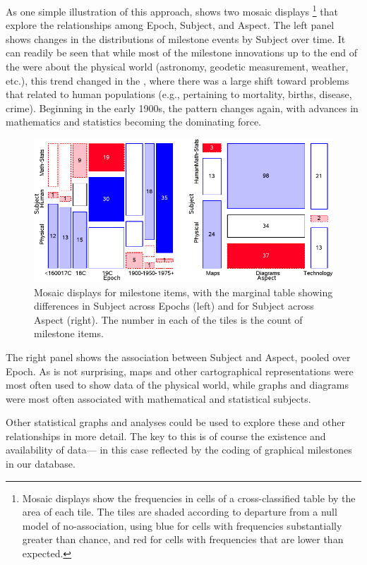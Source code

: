 As one simple illustration of this approach,  shows two mosaic displays%
\footnote{Mosaic displays show the frequencies in cells of a cross-classified table by the area of each tile.  The tiles are shaded according to departure from a null
model of no-association, using blue for cells with frequencies substantially greater than chance, and red for cells with frequencies that are lower than expected.}
that explore the relationships among Epoch, Subject, and Aspect. The left panel shows changes in the distributions of milestone events by Subject over time.  It can readily be seen that while most of the milestone innovations up to the end of the  were about the physical world (astronomy, geodetic measurement, weather, etc.), this trend changed in the , where there was a large shift toward problems that related to human populations (e.g., pertaining to mortality, births, disease, crime). Beginning in the early 1900s, the pattern changes again, with advances in mathematics and statistics becoming the dominating force.

\begin{figure}[!htb]
  \centering
  \includegraphics[width=\textwidth,clip]{fig/milecats4}
  \caption{Mosaic displays for milestone items, with the marginal table showing differences in Subject across Epochs (left) and for Subject across Aspect (right). The number in each of the tiles is the count of milestone items.}
  \label{fig:milecats4}
\end{figure}

The right panel shows the association between Subject and Aspect, pooled over Epoch. As is not surprising, maps and other cartographical representations were most often used to show data of the physical world, while graphs and diagrams were most often associated with mathematical and statistical subjects.

Other statistical graphs and analyses could be used to explore these and other relationships in more detail. The key to this is of course the existence and availability of data--- in this case reflected by the coding of graphical milestones in our database.
